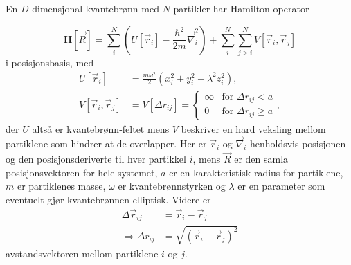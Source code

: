 \documentclass[pdftex,10pt,b5paper,twoside]{book}
\begin{document}
En $D$-dimensjonal kvantebrønn med $N$ partikler har Hamilton-operator

\begin{equation}
\mathbf{H}[\vec{R}] = \sum\limits_i^N \left(U[\vec{r}_i] -\frac{\hbar^2}{2m}\vec{\nabla}_i^2 \right) + \sum\limits_i^N\sum\limits_{j > i}^N V[\vec{r}_i,\vec{r}_j]
\end{equation}
i posisjonsbasis, med
\begin{align}
U[\vec{r}_i] &= \frac{m\omega^2}{2}\left(x_i^2+y_i^2+\lambda^2z_i^2\right), \\
V[\vec{r}_i,\vec{r}_j] &= V[\Delta{r}_{ij}] =\begin{cases} \infty & \text{for $\Delta{r}_{ij} < a$} \\
0 & \text{for $\Delta{r}_{ij} \geq a$} \end{cases},
\end{align}
der $U$ altså er kvantebrønn-feltet mens $V$ beskriver en hard veksling mellom partiklene som hindrer at de overlapper. Her er $\vec{r}_i$ og $\vec{\nabla}_i$ henholdsvis posisjonen og den posisjonsderiverte til hver partikkel $i$, mens $\vec{R}$ er den samla posisjonsvektoren for hele systemet, $a$ er en karakteristisk radius for partiklene, $m$ er partiklenes masse, $\omega$ er kvantebrønnstyrken og $\lambda$ er en parameter som eventuelt gjør kvantebrønnen elliptisk. Videre er
\begin{align}
\Delta\vec{r}_{ij} &= \vec{r}_i-\vec{r}_j \\
\Longrightarrow \Delta{r}_{ij} &= \sqrt{\left(\vec{r}_i-\vec{r}_j\right)^2}
\end{align}
avstandsvektoren mellom partiklene $i$ og $j$.
\end{document}
